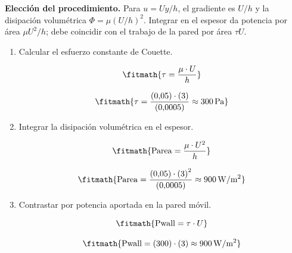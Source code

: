 \noindent\textbf{Elección del procedimiento.} Para $u=Uy/h$, el gradiente es $U/h$ y la disipación volumétrica $\Phi=\mu(U/h)^2$. Integrar en el espesor da potencia por área $\mu U^2/h$; debe coincidir con el trabajo de la pared por área $\tau U$.

\begin{enumerate}

\item Calcular el esfuerzo constante de Couette.

\[\fitmath{\tau=\frac{\mu\cdot U}{h}}\]

\[\fitmath{\tau=\frac{(0{,}05)\cdot (3)}{(0{,}0005)}\approx 300\,\mathrm{Pa}}\]

\item Integrar la disipación volumétrica en el espesor.

\[\fitmath{\mathrm{Parea}=\frac{\mu\cdot {U}^{2}}{h}}\]

\[\fitmath{\mathrm{Parea}=\frac{(0{,}05)\cdot {(3)}^{2}}{(0{,}0005)}\approx 900\,\mathrm{W/m^{2}}}\]

\item Contrastar por potencia aportada en la pared móvil.

\[\fitmath{\mathrm{Pwall}=\tau\cdot U}\]

\[\fitmath{\mathrm{Pwall}=(300)\cdot (3)\approx 900\,\mathrm{W/m^{2}}}\]

\end{enumerate}
